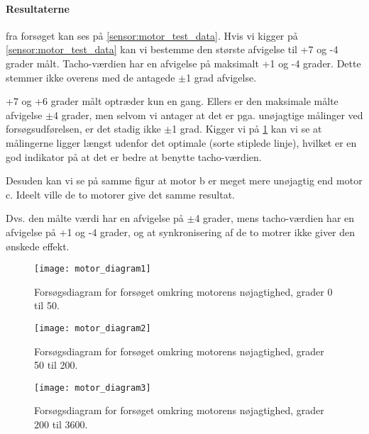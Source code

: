\paragraph{Resultaterne} fra forsøget kan ses på \cref{sensor:motor_test_data}.
Hvis vi kigger på \cref{sensor:motor_test_data} kan vi bestemme den største afvigelse til +7 og -4 grader målt.
Tacho-værdien har en afvigelse på maksimalt +1 og -4 grader.
Dette stemmer ikke overens med de antagede $\pm$1 grad afvigelse.

+7 og +6 grader målt optræder kun en gang.
Ellers er den maksimale målte afvigelse $\pm$4 grader, men selvom vi antager at det er pga. unøjagtige målinger ved forsøgsudførelsen, er det stadig ikke $\pm$1 grad.
Kigger vi på \cref{sensor:motor_sensor_diagram1} kan vi se at målingerne ligger længst udenfor det optimale (sorte stiplede linje), hvilket er en god indikator på at det er bedre at benytte tacho-værdien.

Desuden kan vi se på samme figur at motor b er meget mere unøjagtig end motor c.
Ideelt ville de to motorer give det samme resultat.

Dvs. den målte værdi har en afvigelse på $\pm$4 grader, mens tacho-værdien har en afvigelse på +1 og -4 grader, og at synkronisering af de to motrer ikke giver den ønskede effekt.

\begin{figure}[h]
\centering
\texttt{[image: motor\_diagram1]} 	
\caption{Forsøgsdiagram for forsøget omkring motorens nøjagtighed, grader 0 til 50.}
\label{sensor:motor_sensor_diagram1}
\end{figure}

\begin{figure}[h]
\centering
\texttt{[image: motor\_diagram2]} 	
\caption{Forsøgsdiagram for forsøget omkring motorens nøjagtighed, grader 50 til 200.}
\label{sensor:motor_sensor_diagram2}
\end{figure}

\begin{figure}[h]
\centering
\texttt{[image: motor\_diagram3]} 	
\caption{Forsøgsdiagram for forsøget omkring motorens nøjagtighed, grader 200 til 3600.}
\label{sensor:motor_sensor_diagram3}

\end{figure}